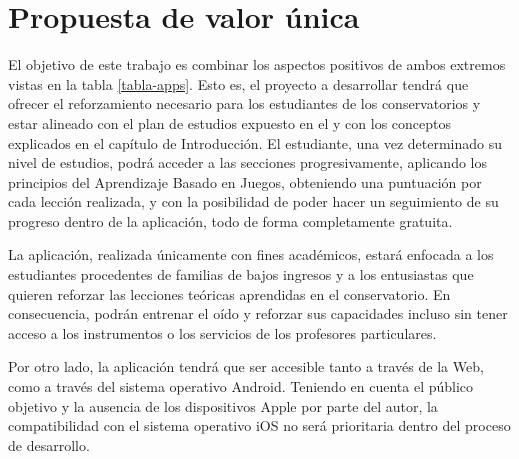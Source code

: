 \section{Propuesta de valor única}
El objetivo de este trabajo es combinar los aspectos positivos de ambos extremos vistas en la tabla \ref{tabla-apps}. Esto es, el proyecto a desarrollar tendrá que ofrecer el reforzamiento necesario para los estudiantes de los conservatorios y estar alineado con el plan de estudios expuesto en el \cite{rd-1577-2006} y con los conceptos explicados en el capítulo de Introducción. El estudiante, una vez determinado su nivel de estudios, podrá acceder a las secciones progresivamente, aplicando los principios del Aprendizaje Basado en Juegos, obteniendo una puntuación por cada lección realizada, y con la posibilidad de poder hacer un seguimiento de su progreso dentro de la aplicación, todo de forma completamente gratuita.
\par La aplicación, realizada únicamente con fines académicos, estará enfocada a los estudiantes procedentes de familias de bajos ingresos y a los entusiastas que quieren reforzar las lecciones teóricas aprendidas en el conservatorio. En consecuencia, podrán entrenar el oído y reforzar sus capacidades incluso sin tener acceso a los instrumentos o los servicios de los profesores particulares.
\par Por otro lado, la aplicación tendrá que ser accesible tanto a través de la Web, como a través del sistema operativo Android. Teniendo en cuenta el público objetivo y la ausencia de los dispositivos Apple por parte del autor, la compatibilidad con el sistema operativo iOS no será prioritaria dentro del proceso de desarrollo.
